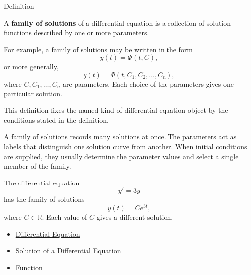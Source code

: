 
\begin{definitionbox}{Definition}
\begin{definition}
\label{def:ordinary-differential-equations-solutions-family-of-solutions}
A \textbf{family of solutions} of a differential equation is a collection of solution functions described by one or more parameters.

For example, a family of solutions may be written in the form
\[
y(t)=\Phi(t,C),
\]
or more generally,
\[
y(t)=\Phi(t,C_1,C_2,\dots,C_n),
\]
where $C,C_1,\dots,C_n$ are parameters. Each choice of the parameters gives one particular solution.
\end{definition}
\end{definitionbox}

\begin{remark*}
This definition fixes the named kind of differential-equation object by the
conditions stated in the definition.
\end{remark*}

\begin{remark*}[Interpretation]
A family of solutions records many solutions at once. The parameters act as labels that distinguish one solution curve from another. When initial conditions are supplied, they usually determine the parameter values and select a single member of the family.
\end{remark*}

\begin{remark*}[Examples]
The differential equation
\[
y'=3y
\]
has the family of solutions
\[
y(t)=Ce^{3t},
\]
where $C\in\mathbb{R}$. Each value of $C$ gives a different solution.
\end{remark*}

\begin{dependencies}
\begin{itemize}
  \item \hyperref[def:ordinary-differential-equations-terminology-differential-equation]{Differential Equation}
  \item \hyperref[def:ordinary-differential-equations-terminology-solution-of-a-differential-equation]{Solution of a Differential Equation}
  \item \hyperref[def:function]{Function}
\end{itemize}
\end{dependencies}

